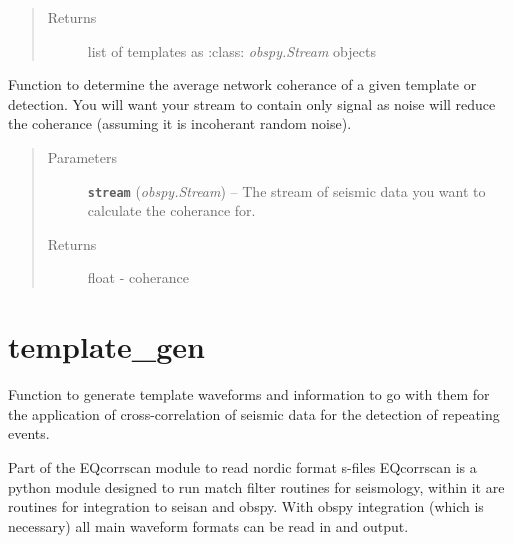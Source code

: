 \documentclass[a4paper,10pt,english]{sphinxmanual}
\begin{document}
\begin{fulllineitems}
\begin{quote}
\begin{description}
\begin{itemize}
\end{itemize}

\item[{Returns}] \leavevmode
list of templates as :class: \emph{obspy.Stream} objects

\end{description}\end{quote}

\end{fulllineitems}


\begin{fulllineitems}
\label{modules:bright_lights.coherance}
Function to determine the average network coherance of a given template or
detection.  You will want your stream to contain only signal as noise
will reduce the coherance (assuming it is incoherant random noise).
\begin{quote}\begin{description}
\item[{Parameters}] \leavevmode
\textbf{\texttt{stream}} (\emph{obspy.Stream}) -- The stream of seismic data you want to calculate the
coherance for.

\item[{Returns}] \leavevmode
float - coherance

\end{description}\end{quote}

\end{fulllineitems}



\section{template\_gen}
\label{modules:template-gen}\label{modules:module-template_gen}
Function to generate template waveforms and information to go with them for the
application of cross-correlation of seismic data for the detection of repeating
events.

Part of the EQcorrscan module to read nordic format s-files
EQcorrscan is a python module designed to run match filter routines for
seismology, within it are routines for integration to seisan and obspy.
With obspy integration (which is necessary) all main waveform formats can be
read in and output.
\end{document}
